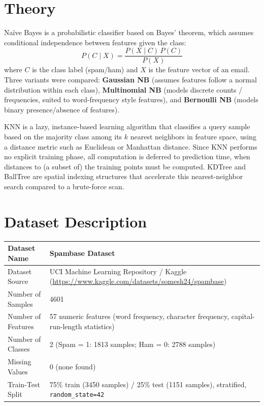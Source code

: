 \documentclass[12pt,a4paper]{article}
\begin{document}
\section*{Theory}
Na\"ive Bayes is a probabilistic classifier based on Bayes' theorem, which assumes
conditional independence between features given the class:
\begin{equation}
P(C \mid X) = \frac{P(X \mid C)\,P(C)}{P(X)}
\end{equation}
where $C$ is the class label (spam/ham) and $X$ is the feature vector of an email.
Three variants were compared: \textbf{Gaussian NB} (assumes features follow a normal
distribution within each class), \textbf{Multinomial NB} (models discrete counts /
frequencies, suited to word-frequency style features), and \textbf{Bernoulli NB}
(models binary presence/absence of features).

KNN is a lazy, instance-based learning algorithm that classifies a query sample based on
the majority class among its $k$ nearest neighbors in feature space, using a distance
metric such as Euclidean or Manhattan distance. Since KNN performs no explicit training
phase, all computation is deferred to prediction time, when distances to (a subset of)
the training points must be computed. KDTree and BallTree are spatial indexing
structures that accelerate this nearest-neighbor search compared to a brute-force scan.

\section{Dataset Description}
\begin{longtable}{|p{6cm}|p{8cm}|}
\hline
Dataset Name & Spambase Dataset \\ \hline
Dataset Source & UCI Machine Learning Repository / Kaggle (\url{https://www.kaggle.com/datasets/somesh24/spambase}) \\ \hline
Number of Samples & 4601 \\ \hline
Number of Features & 57 numeric features (word frequency, character frequency, capital-run-length statistics) \\ \hline
Number of Classes & 2 (Spam = 1: 1813 samples; Ham = 0: 2788 samples) \\ \hline
Missing Values & 0 (none found) \\ \hline
Train-Test Split & 75\% train (3450 samples) / 25\% test (1151 samples), stratified, \texttt{random\_state=42} \\ \hline
\end{longtable}
\end{document}
